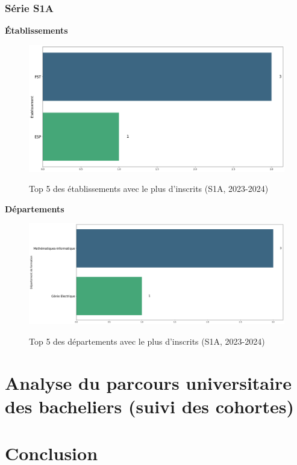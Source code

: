 \newpage
\subsubsection{Série S1A}

\textbf{Établissements}

\begin{figure}[ht]
\centering
\caption{Top 5 des établissements avec le plus d'inscrits (S1A, 2023-2024)}
\includegraphics[width=1\textwidth]{figure/etab_S1A_2024.png}
\label{fig:etab_s1a_2024}
\end{figure}

\textbf{Départements}

\begin{figure}[ht]
\centering
\caption{Top 5 des départements avec le plus d'inscrits (S1A, 2023-2024)}
\includegraphics[width=1\textwidth]{figure/dep_S1A_2024.png}
\label{fig:dep_s1a_2024}
\end{figure}

\newpage
\section{Analyse du parcours universitaire des bacheliers (suivi des cohortes)}

\section{Conclusion}